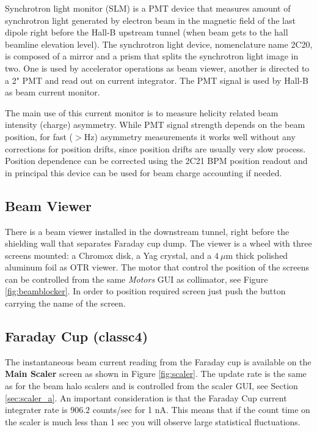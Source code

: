 \documentclass[12pt]{article}
\begin{document}
Synchrotron light monitor (SLM) is a PMT device that measures amount of synchrotron light generated by electron beam in the magnetic field of the last dipole right before the Hall-B upstream tunnel (when beam gets to the hall beamline elevation level). The synchrotron light device, nomenclature name 2C20, is composed of a mirror and a prism that splits the synchrotron light image in two. One is used by accelerator operations as beam viewer, another is directed to a 2" PMT and read out  on current integrator. The PMT signal is used by Hall-B as beam current monitor.   

The main use of this current monitor is to measure helicity related beam intensity (charge) asymmetry. While PMT signal strength depends on the beam position, for fast ($>$Hz) asymmetry measurements it works well without any corrections for position drifts, since position drifts are usually very slow process. Position dependence can be corrected using the 2C21 BPM position readout and in principal this device can be used for beam charge accounting if needed.    

\subsection{Beam Viewer \label{sec:view}}
\indent

There is a beam viewer installed in the downstream tunnel, right before the shielding wall that separates Faraday cup dump. The viewer is a wheel with three screens mounted: a Chromox disk, a Yag crystal, and a $4~\mu$m thick polished aluminum foil as OTR viewer. The motor that control the position of the screens can be controlled from the same {\it Motors} GUI as collimator, see Figure \ref{fig:beamblocker}. In order to position required screen just push the button carrying the name of the screen.  

\subsection{Faraday Cup (classc4) \label{sec:fcup}}
\indent

The instantaneous beam current reading from the Faraday cup is available on
the \textbf{Main Scaler} screen as shown in Figure \ref{fig:scaler}. The update rate is the same as for the beam halo scalers and
is controlled from the scaler GUI, see Section \ref{sec:scaler_a}. An important consideration
is that the Faraday Cup current integrater rate is $906.2$ counts/sec for 1 nA. This means that if the count time on the scaler is much less than 1 sec
you will observe large statistical fluctuations.
\end{document}
